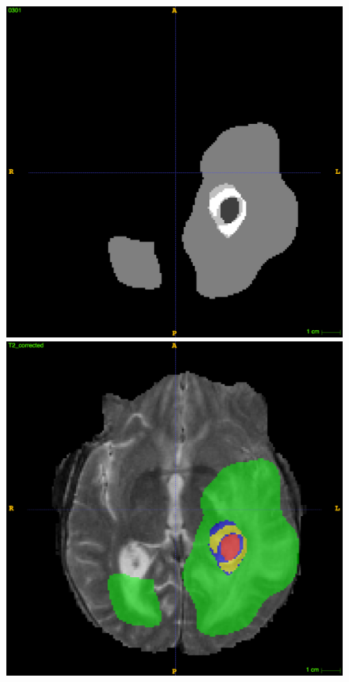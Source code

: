 \documentclass[12pt,a4paper,twoside,openright]{report}
\begin{document}
\begin{figure}
	\\
	\vspace{0.5cm}
	\includegraphics[scale = 0.1]{challenge_1_segmentation_71}
	\includegraphics[scale = 0.1]{challenge_1_segmentation_with_T2_71}

\end{figure}
\end{document}
